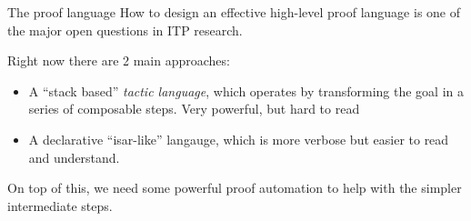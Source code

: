 \documentclass{beamer}
\begin{document}
\begin{frame}{The proof language}
  How to design an effective high-level proof language is one of the
  major open questions in ITP research.\bigskip

  Right now there are 2 main approaches:
  \begin{itemize}
  \item A ``stack based'' \emph{tactic language}, which operates by transforming the goal in a series of composable steps. Very powerful, but hard to read
  \item A declarative ``isar-like'' langauge, which is more verbose but easier to read and understand.
  \end{itemize}
  
  On top of this, we need some powerful proof automation to help with
  the simpler intermediate steps.
\end{frame}
\end{document}
